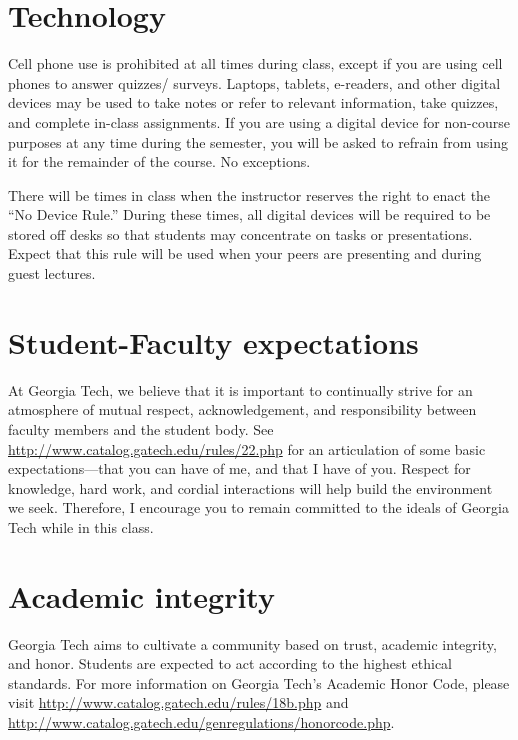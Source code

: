 \documentclass[
]{article}
\begin{document}
\hypertarget{technology}{%
\section{Technology}\label{technology}}

Cell phone use is prohibited at all times during class, except if you
are using cell phones to answer quizzes/ surveys. Laptops, tablets,
e-readers, and other digital devices may be used to take notes or refer
to relevant information, take quizzes, and complete in-class
assignments. If you are using a digital device for non-course purposes
at any time during the semester, you will be asked to refrain from using
it for the remainder of the course. No exceptions.

There will be times in class when the instructor reserves the right to
enact the ``No Device Rule.'' During these times, all digital devices
will be required to be stored off desks so that students may concentrate
on tasks or presentations. Expect that this rule will be used when your
peers are presenting and during guest lectures.

\hypertarget{student-faculty-expectations}{%
\section{Student-Faculty
expectations}\label{student-faculty-expectations}}

At Georgia Tech, we believe that it is important to continually strive
for an atmosphere of mutual respect, acknowledgement, and responsibility
between faculty members and the student body. See
\url{http://www.catalog.gatech.edu/rules/22.php} for an articulation of
some basic expectations---that you can have of me, and that I have of
you. Respect for knowledge, hard work, and cordial interactions will
help build the environment we seek. Therefore, I encourage you to remain
committed to the ideals of Georgia Tech while in this class.

\hypertarget{academic-integrity}{%
\section{Academic integrity}\label{academic-integrity}}

Georgia Tech aims to cultivate a community based on trust, academic
integrity, and honor. Students are expected to act according to the
highest ethical standards. For more information on Georgia Tech's
Academic Honor Code, please visit
\url{http://www.catalog.gatech.edu/rules/18b.php} and
\url{http://www.catalog.gatech.edu/genregulations/honorcode.php}.
\end{document}
